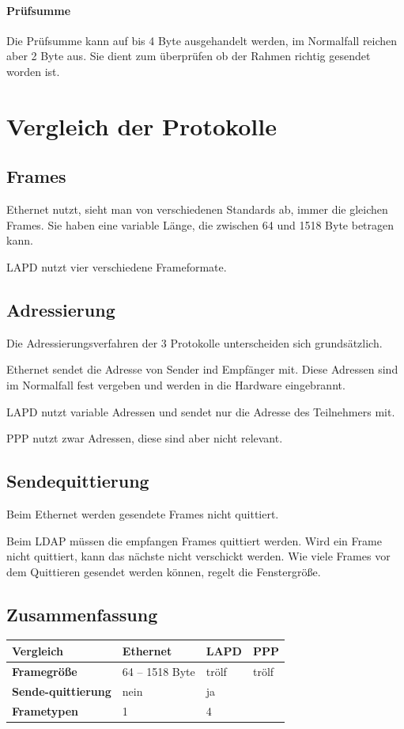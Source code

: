 \documentclass[12pt, a4paper, ngerman]{article}
\begin{document}
\paragraph{Prüfsumme}

Die Prüfsumme kann auf bis 4 Byte ausgehandelt werden, im Normalfall reichen aber 2 Byte aus. Sie dient zum überprüfen ob der Rahmen richtig gesendet worden ist.


\section{Vergleich der Protokolle}
\subsection{Frames}
Ethernet nutzt, sieht man von verschiedenen Standards ab, immer die gleichen Frames. Sie haben eine variable Länge, die zwischen 64 und 1518 Byte betragen kann.

LAPD nutzt vier verschiedene Frameformate. 
\subsection{Adressierung}
Die Adressierungsverfahren der 3 Protokolle unterscheiden sich grundsätzlich. 

Ethernet sendet die Adresse von Sender ind Empfänger mit. Diese Adressen sind im Normalfall fest vergeben und werden in die Hardware eingebrannt.

LAPD nutzt variable Adressen und sendet nur die Adresse des Teilnehmers mit.

PPP nutzt zwar Adressen, diese sind aber nicht relevant.

\subsection{Sendequittierung}
Beim Ethernet werden gesendete Frames nicht quittiert. 

Beim LDAP müssen die empfangen Frames quittiert werden. Wird ein Frame nicht quittiert, kann das nächste nicht verschickt werden. Wie viele Frames vor dem Quittieren gesendet werden können, regelt die Fenstergröße.

\subsection{Zusammenfassung}

\begin{tabular}{| m{} || m{} | m{} | m{} |}
\hline
\textbf{Vergleich} & \textbf{Ethernet} & \textbf{LAPD} & \textbf{PPP} \\ \hline \hline

\textbf{Framegröße} & 64 -- 1518 Byte & trölf & trölf \\ \hline

\textbf{Sende-quittierung} & nein & ja & \\ \hline

\textbf{Frametypen} & 1 & 4 &  \\ \hline
\end{tabular}


   
\nocite{*} 

\newpage
\sloppy
\printbibliography 



\newpage
\listoffigures
\end{document}
